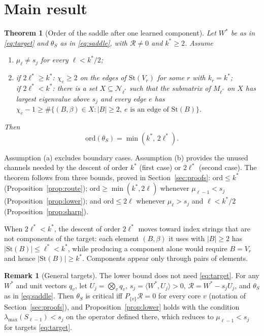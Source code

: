 \documentclass[11pt]{article}
\newtheorem{theorem}{Theorem}
\theoremstyle{definition}
\newtheorem{remark}{Remark}
\newcommand{\St}{\mathrm{St}}
\newcommand{\ord}{\mathrm{ord}}
\newcommand{\ip}[2]{\langle #1,#2\rangle}
\begin{document}
\section{Main result}

\begin{theorem}[Order of the saddle after one learned component]\label{thm:main}
Let $W^*$ be as in \eqref{eq:target} and $\theta_S$ as in \eqref{eq:saddle}, with $\mathcal R\ne0$ and $k^*\ge2$. Assume
\begin{enumerate}[label=(\alph*)]
\item $\mu_\ell\ne s_j$ for every $\ell<k^*/2$;
\item if $2\ell^*\ge k^*$: $\chi_e\ge2$ on the edges of $\St(V_r)$ for some $r$ with $k_r=k^*$;\\
if $2\ell^*<k^*$: there is a set $X\subseteq\mathcal N_{\ell^*}$ such that the submatrix of $M_{\ell^*}$ on $X$ has largest
eigenvalue above $s_j$ and every edge $e$ has $\chi_e-1\ge\#\{(B,\beta)\in X:\lvert B\rvert\ge2,\ e\text{ is an edge of }\St(B)\}$.
\end{enumerate}
Then
\[
\ord(\theta_S)=\min(k^*,\,2\ell^*).
\]
\end{theorem}

Assumption (a) excludes boundary cases. Assumption (b) provides the unused channels needed by the descent of order
$k^*$ (first case) or $2\ell^*$ (second case). The theorem follows from three bounds, proved in
Section~\ref{sec:proofs}: $\ord\le k^*$ (Proposition~\ref{prop:route}); $\ord\ge\min(k^*,2\ell)$ whenever
$\mu_{\ell-1}<s_j$ (Proposition~\ref{prop:lower}); and $\ord\le2\ell$ whenever $\mu_\ell>s_j$ and $\ell<k^*/2$
(Proposition~\ref{prop:sharp}).

When $2\ell^*<k^*$, the descent of order $2\ell^*$ moves toward index strings that are not components of the target:
each element $(B,\beta)$ it uses with $\lvert B\rvert\ge2$ has $\lvert\St(B)\rvert\le\ell^*<k^*$, while producing a component
alone would require $B=V_r$ and hence $\lvert\St(B)\rvert\ge k^*$. Components appear only through pairs of elements.

\begin{remark}[General targets]\label{rem:general}
The lower bound does not need \eqref{eq:target}. For any $W^*$ and unit vectors $q_v$, let $U_j=\bigotimes_vq_v$,
$s_j=\ip{W^*}{U_j}>0$, $\mathcal R=W^*-s_jU_j$, and $\theta_S$ as in \eqref{eq:saddle}. Then $\theta_S$ is critical iff
$P_{\{v\}}\mathcal R=0$ for every core $v$ (notation of Section~\ref{sec:proofs}), and Proposition~\ref{prop:lower} holds with the
condition $\lambda_{\max}(S_{\ell-1})<s_j$ on the operator defined there, which reduces to $\mu_{\ell-1}<s_j$ for targets
\eqref{eq:target}.
\end{remark}
\end{document}

